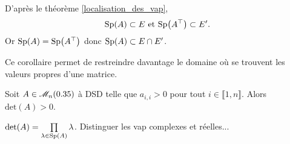 \begin{preuve}
    D'après le théorème \ref{localisation_des_vap}, 
    $$\mathrm{Sp}(A) \subset E \text{ et } \mathrm{Sp} \big( A^\top \big) \subset E'.$$
    Or $\mathrm{Sp}(A) = \mathrm{Sp} \big( A^\top \big)$ donc $\mathrm{Sp}(A) \subset E \cap E'$.
\end{preuve}    

Ce corollaire permet de restreindre davantage le domaine où se trouvent les valeurs propres d'une matrice. 

\begin{prop}{}
    Soit $A \in \mathscr{M}_n(0.35)$ à DSD telle que $a_{i,i} > 0$ pour tout $i \in \llbracket 1, n \rrbracket$. Alors $\mathrm{det}(A) > 0$. 
\end{prop}

\begin{preuve}
        $\det(A) = \prod\limits_{\lambda \in \mathrm{Sp}(A)} \lambda$. Distinguer les vap complexes et réelles...
\end{preuve}
